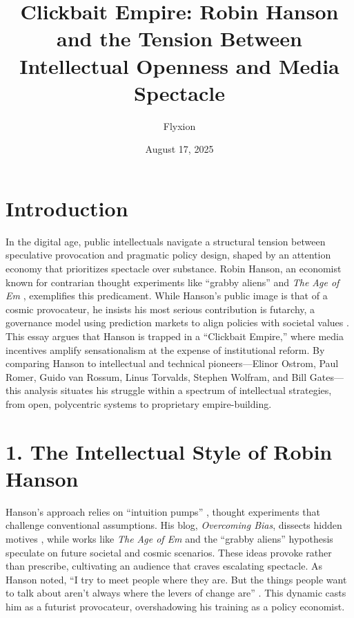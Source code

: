 \documentclass[12pt]{article}
\begin{document}
\title{\textbf{Clickbait Empire: Robin Hanson and the Tension Between Intellectual Openness and Media Spectacle}}
\author{Flyxion}
\date{August 17, 2025}
\maketitle

\section*{Introduction}

In the digital age, public intellectuals navigate a structural tension between speculative provocation and pragmatic policy design, shaped by an attention economy that prioritizes spectacle over substance. Robin Hanson, an economist known for contrarian thought experiments like ``grabby aliens'' \citep{hanson2021} and \emph{The Age of Em} \citep{hanson2016}, exemplifies this predicament. While Hanson’s public image is that of a cosmic provocateur, he insists his most serious contribution is futarchy, a governance model using prediction markets to align policies with societal values \citep{hanson2001,hanson2013}. This essay argues that Hanson is trapped in a ``Clickbait Empire,'' where media incentives amplify sensationalism at the expense of institutional reform. By comparing Hanson to intellectual and technical pioneers---Elinor Ostrom, Paul Romer, Guido van Rossum, Linus Torvalds, Stephen Wolfram, and Bill Gates---this analysis situates his struggle within a spectrum of intellectual strategies, from open, polycentric systems to proprietary empire-building.

\section*{1. The Intellectual Style of Robin Hanson}

Hanson’s approach relies on ``intuition pumps'' \citep{dennett1984}, thought experiments that challenge conventional assumptions. His blog, \emph{Overcoming Bias}, dissects hidden motives \citep{hanson2009}, while works like \emph{The Age of Em} \citep{hanson2016} and the ``grabby aliens'' hypothesis \citep{hanson2021} speculate on future societal and cosmic scenarios. These ideas provoke rather than prescribe, cultivating an audience that craves escalating spectacle. As Hanson noted, ``I try to meet people where they are. But the things people want to talk about aren’t always where the levers of change are'' \citep{lunar2024}. This dynamic casts him as a futurist provocateur, overshadowing his training as a policy economist.
\end{document}
